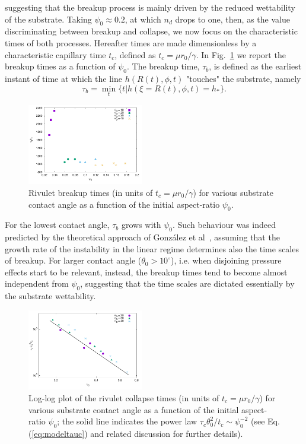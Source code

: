 \documentclass[twoside,twocolumn,9pt]{article}
\begin{document}
suggesting that the breakup process is mainly driven by the reduced wettability of the substrate.
Taking $\psi_0 \approx 0.2$, at which $n_d$ drops to one, then, as the 
value discriminating between breakup and collapse, we now focus on the 
characteristic times of both processes.
Hereafter times are made dimensionless by a characteristic capillary time $t_c$, defined as 
$t_c = \mu r_0/\gamma$.
In Fig.~\ref{fig:breakuptimes} we report the breakup times as a function of $\psi_0$.
The breakup time, $\tau_b$, is defined as the earliest instant of time at
which the line $h(R(t),\phi,t)$ "touches" the substrate, namely
\begin{equation}\label{eq:breakuptime}
\tau_b = \min_t \{t | h(\xi=R(t),\phi,t) = h_{\ast}\}.
\end{equation}
\begin{figure}
    \centering
    \includegraphics[width = 0.45\textwidth]{taub_vs_psi0.pdf}
    \caption{Rivulet breakup times (in units of $t_c = \mu r_0/\gamma$) for various substrate contact angle 
    as a function of the initial aspect-ratio $\psi_0$.}
    \label{fig:breakuptimes}
\end{figure}
For the lowest contact angle, $\tau_b$ grows with $\psi_0$. Such behaviour
was indeed predicted by the theoretical approach of Gonz\'alez et al~\cite{gonzalezStabilityLiquidRing2013}, assuming that the growth rate of the instability in the linear regime determines also the time scales of breakup. For larger contact angle ($\theta_0 > 10^{\circ}$), i.e. when disjoining pressure effects start to be relevant, instead, the breakup times tend to become almost independent from $\psi_0$, suggesting that the time scales are dictated essentially by the substrate wettability.\\
\begin{figure}
    \centering
    \includegraphics[width = 0.45\textwidth]{tauc_vs_psi0.pdf}
    \caption{Log-log plot of the rivulet collapse times (in units of $t_c = \mu r_0/\gamma$) for various substrate contact angle 
    as a function of the initial aspect-ratio $\psi_0$; the solid line indicates the power law $\tau_c \theta_0^2/t_c \sim \psi_0^{-2}$ (see Eq.(\ref{eq:modeltauc}) and related discussion for further details).}
    \label{fig:collapsetimes}
\end{figure}
\end{document}
